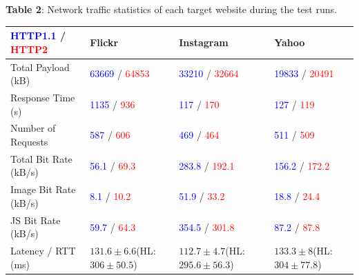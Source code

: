 \documentclass[noback]{cuposter}
\begin{document}
\begin{center}

\textbf{Table 2}: Network traffic statistics of each target website during the test runs.

\begin{tabular}{|l|K{7.2cm}|K{8cm}|K{7.5cm}|}
    \hline
    \textcolor{blue}{HTTP1.1} / \textcolor{red}{HTTP2} & Flickr & Instagram & Yahoo \\ \hline \hline
    Total Payload (kB) & \textcolor{blue}{63669} / \textcolor{red}{64853}  & \textcolor{blue}{33210} / \textcolor{red}{32664}  &
    \textcolor{blue}{19833} / \textcolor{red}{20491}  \\ \hline
    Response Time (s) & \textcolor{blue}{1135} / \textcolor{red}{936}  &\textcolor{blue}{117} / \textcolor{red}{170}  &
    \textcolor{blue}{127} / \textcolor{red}{119}  \\ \hline

    Number of Requests & \textcolor{blue}{587} / \textcolor{red}{606} & \textcolor{blue}{469} / \textcolor{red}{464} & \textcolor{blue}{511} / \textcolor{red}{509} \\ \hline \hline

    Total Bit Rate (kB/s) & \textcolor{blue}{56.1} / \textcolor{red}{69.3} & \textcolor{blue}{283.8} / \textcolor{red}{192.1} & \textcolor{blue}{156.2} / \textcolor{red}{172.2} \\  \hline

    Image Bit Rate (kB/s) & \textcolor{blue}{8.1} / \textcolor{red}{10.2} &\textcolor{blue}{51.9} / \textcolor{red}{33.2}  & \textcolor{blue}{18.8} / \textcolor{red}{24.4}  \\ \hline

    JS Bit Rate (kB/s) & \textcolor{blue}{59.7} / \textcolor{red}{64.3} &\textcolor{blue}{354.5} / \textcolor{red}{301.8}  & \textcolor{blue}{87.2} / \textcolor{red}{87.8}  \\ \hline \hline

    Latency / RTT (ms) & $131.6\pm6.6$\newline(HL: $306\pm50.5$)	& $112.7\pm4.7$\newline(HL: $295.6\pm56.3$) & $133.3\pm8$\newline(HL: $304\pm77.8$)	\\ \hline
\end{tabular}
\end{center}
\vspace{8mm}
\end{document}
